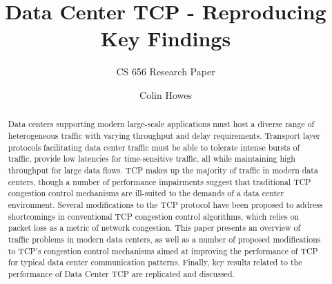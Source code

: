 \documentclass[sigconf]{acmart}
\begin{document}
\title{Data Center TCP - Reproducing Key Findings}
\subtitle{CS 656 Research Paper}

\author{Colin Howes}

\begin{abstract}

Data centers supporting modern large-scale applications must host a diverse range of heterogeneous traffic with varying throughput and delay requirements. Transport layer protocols facilitating data center traffic must be able to tolerate intense bursts of traffic, provide low latencies for time-sensitive traffic, all while maintaining high throughput for large data flows. TCP makes up the majority of traffic in modern data centers, though a number of performance impairments suggest that traditional TCP congestion control mechanisms are ill-suited to the demands of a data center environment. Several modifications to the TCP protocol have been proposed to address shortcomings in conventional TCP congestion control algorithms, which relies on packet loss as a metric of network congestion. This paper presents an overview of traffic problems in modern data centers, as well as a number of proposed modifications to TCP's congestion control mechanisms aimed at improving the performance of TCP for typical data center communication patterns. Finally, key results related to the performance of Data Center TCP are replicated and discussed.

\end{abstract}

\maketitle




 
\end{document}
